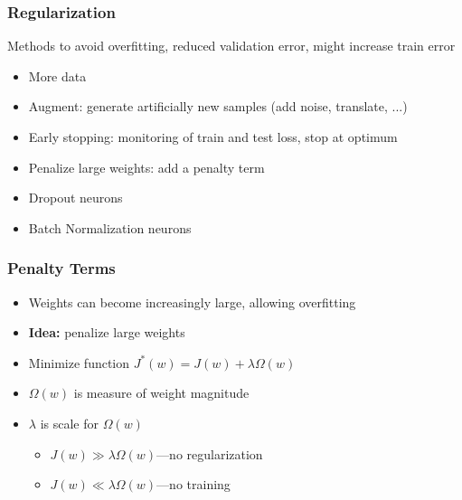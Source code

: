 \documentclass[aspectratio=1610]{beamer}
\begin{document}
\begin{frame}
\frametitle{Regularization}

Methods to avoid overfitting, reduced validation error, might increase train error
\medskip
\begin{itemize}
    \item More data
    \item Augment: generate artificially new samples (add noise, translate, ...)
    \item Early stopping: monitoring of train and test loss, stop at optimum
    \item Penalize large weights: add a penalty term
    \item Dropout neurons
    \item Batch Normalization neurons
\end{itemize}
\end{frame}

\begin{frame}
    \frametitle{Penalty Terms}
    
    \begin{itemize}
        \item Weights can become increasingly large, allowing overfitting
        \item \textbf{Idea:} penalize large weights
        \item Minimize function $J^{*}(w)=J(w)+\lambda\Omega (w)$
        \item $\Omega (w)$ is measure of weight magnitude
        \item $\lambda$ is scale for $\Omega (w)$
        \begin{itemize}
            \item $J(w)\gg\lambda\Omega (w)$---no regularization
            \item $J(w)\ll\lambda\Omega (w)$---no training
        \end{itemize}
    \end{itemize}
\end{frame}
\end{document}

